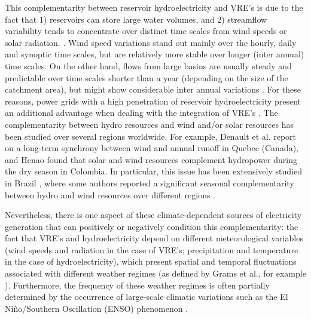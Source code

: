 \documentclass[AMA,Times1COL]{WileyNJDv5} %
\begin{document}
\begin{linenumbers}
This complementarity between reservoir hydroelectricity and VRE's is due to the fact that 1) reservoirs can store large water volumes, and 2) streamflow variability tends to concentrate over distinct time scales from wind speeds or solar radiation. \cite{wan1993factors}. Wind speed variations stand out mainly over the hourly, daily and synoptic time scales, but are relatively more stable over longer (inter annual) time scales. On the other hand, flows from large basins are usually steady and predictable over time scales shorter than a year (depending on the size of the catchment area), but might show considerable inter annual variations \cite{acker2012integration, soberanis2015regarding}. For these reasons, power grids with a high penetration of reservoir hydroelectricity present an additional advantage when dealing with the integration of VRE's \cite{wan1993factors, acker2012integration, gullberg2013political}. The complementarity between hydro resources and wind and/or solar resources has been studied over several regions worldwide. For example, Denault et al. \cite{denault2009complementarity} report on a long-term synchrony between wind and annual runoff in Quebec (Canada), and Henao \cite{henao2020annual} found that solar and wind resources complement hydropower during the dry season in Colombia. In particular, this issue has been extensively studied in Brazil \cite{ricosti2013assessment, schmidt2016optimal} , where some authors reported a significant seasonal complementarity between hydro and wind resources over different regions \cite{do2000wind, silva2016complementarity, cantao2017evaluation}.

Nevertheless, there is one aspect of these climate-dependent sources of electricity generation that can positively or negatively condition this complementarity: the fact that VRE's and hydroelectricity depend on different meteorological variables (wind speeds and radiation in the case of VRE's; precipitation and temperature in the case of hydroelectricity), which present spatial and temporal fluctuations associated with different weather regimes (as defined by Grams et al., for example \cite{grams2017balancing}). Furthermore, the frequency of these weather regimes is often partially determined by the occurrence of large-scale climatic variations such as the El Niño/Southern Oscillation (ENSO) phenomenon \cite{bridgman2014global}. 


\end{linenumbers}
\end{document}

